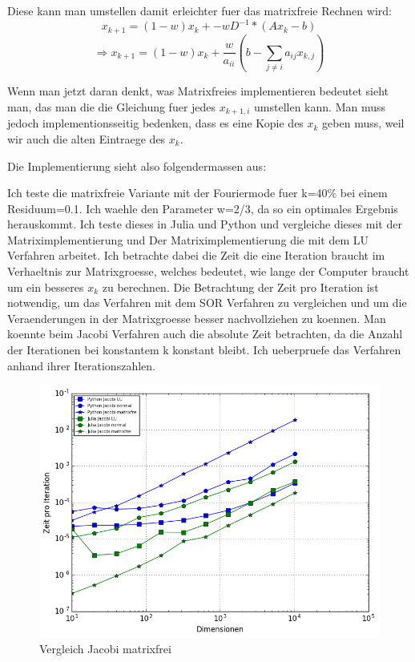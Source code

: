 \documentclass[a4paper, 11pt]{article}
\begin{document}
Diese kann man umstellen damit erleichter fuer das matrixfreie Rechnen wird: 
\begin{equation}
x_{k+1}=(1-w)x_{k}+-wD^{-1}*(Ax_{k}-b)
\end{equation}
\begin{equation}
\Rightarrow x_{k+1}=(1-w)x_{k}+\frac{w}{a_{ii}}(b-\sum_{j \neq i}a_{ij}x_{k,j})
\end{equation}

Wenn man jetzt daran denkt, was Matrixfreies implementieren bedeutet sieht man, das man die die Gleichung fuer jedes \(x_{k+1,i}\) umstellen kann. Man muss jedoch implementionsseitig bedenken, dass es eine Kopie
des \(x_{k}\) geben muss, weil wir auch die alten Eintraege des \(x_{k}\).

Die Implementierung sieht also folgendermassen aus:

Ich teste die matrixfreie Variante mit der Fouriermode fuer k=40\% bei einem Residuum=0.1. Ich waehle den Parameter w=2/3, da so ein optimales Ergebnis herauskommt. Ich teste dieses in Julia und Python und vergleiche dieses mit 
der Matriximplementierung und Der Matriximplementierung die mit dem LU Verfahren arbeitet. Ich betrachte dabei die Zeit die eine Iteration braucht im Verhaeltnis zur Matrixgroesse, welches bedeutet, wie lange der Computer braucht 
um ein besseres \(x_{k}\) zu berechnen. Die Betrachtung der Zeit pro Iteration ist notwendig, um das Verfahren mit dem SOR Verfahren zu vergleichen und um die Veraenderungen in der Matrixgroesse besser nachvollziehen zu koennen. 
Man koennte beim Jacobi Verfahren auch die absolute Zeit betrachten, da die Anzahl der Iterationen bei konstantem k konstant bleibt. Ich ueberpruefe das Verfahren anhand ihrer Iterationszahlen.

\begin{figure}[h]
	\centering
	\includegraphics[width=1\textwidth]{jacobimatrixfrei.png}
	\caption{Vergleich Jacobi matrixfrei}
	\label{img:Bild5}
\end{figure}
\end{document}
